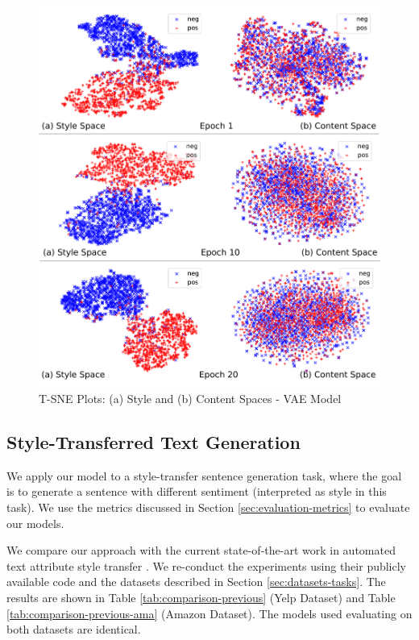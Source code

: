 \begin{figure}[ht]
	\includegraphics[width=\linewidth]{images/latent-spaces-vae}
	\caption{T-SNE Plots: (a) Style and (b) Content Spaces - VAE Model}
	\label{fig:vae-tsne}
\end{figure}

\subsection{Style-Transferred Text Generation}

We apply our model to a style-transfer sentence generation task, where the goal is to generate a sentence with different sentiment (interpreted as style in this task). We use the metrics discussed in Section \ref{sec:evaluation-metrics} to evaluate our models.

We compare our approach with the current state-of-the-art work in automated text attribute style transfer \citep{shen2017style,fu2017style}. We re-conduct the experiments using their publicly available code and the datasets described in Section \ref{sec:datasets-tasks}. The results are shown in Table \ref{tab:comparison-previous} (Yelp Dataset) and Table \ref{tab:comparison-previous-ama} (Amazon Dataset). The models used evaluating on both datasets are identical.

